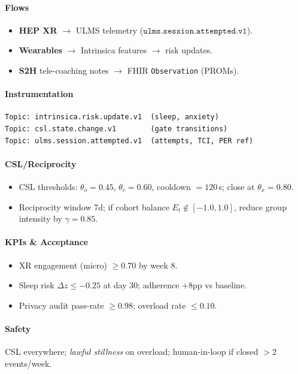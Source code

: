\documentclass[11pt]{article}
\theoremstyle{plain}
\begin{document}
\paragraph{Flows}
\begin{itemize}
  \item \textbf{HEP XR} $\rightarrow$ ULMS telemetry ($\texttt{ulms.session.attempted.v1}$).
  \item \textbf{Wearables} $\rightarrow$ Intrinsica features $\rightarrow$ risk updates.
  \item \textbf{S2H} tele-coaching notes $\rightarrow$ FHIR \texttt{Observation} (PROMs).
\end{itemize}

\paragraph{Instrumentation}
\begin{verbatim}
Topic: intrinsica.risk.update.v1  (sleep, anxiety)
Topic: csl.state.change.v1        (gate transitions)
Topic: ulms.session.attempted.v1  (attempts, TCI, PER ref)
\end{verbatim}

\paragraph{CSL/Reciprocity}
\begin{itemize}
  \item CSL thresholds: $\theta_o=0.45$, $\theta_c=0.60$, cooldown $=120$\,s; close at $\theta_x=0.80$.
  \item Reciprocity window 7d; if cohort balance $E_t\notin[{-}1.0,1.0]$, reduce group intensity by $\gamma=0.85$.
\end{itemize}

\paragraph{KPIs \& Acceptance}
\begin{itemize}
  \item XR engagement (micro) $\ge 0.70$ by week 8.
  \item Sleep risk $\Delta z \le -0.25$ at day 30; adherence $+8$pp vs baseline.
  \item Privacy audit pass-rate $\ge 0.98$; overload rate $\le 0.10$.
\end{itemize}

\paragraph{Safety}
CSL everywhere; \emph{lawful stillness} on overload; human-in-loop if closed $>2$ events/week.
\end{document}
